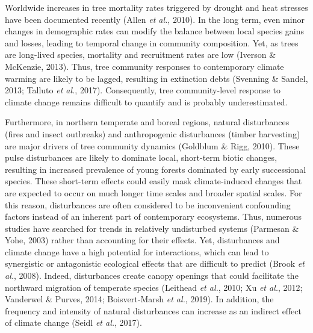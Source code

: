 \documentclass[a4paperpaper,]{article}
\begin{document}
Worldwide increases in tree mortality rates triggered by drought and
heat stresses have been documented recently (Allen \emph{et al.}, 2010).
In the long term, even minor changes in demographic rates can modify the
balance between local species gains and losses, leading to temporal
change in community composition. Yet, as trees are long-lived species,
mortality and recruitment rates are low (Iverson \& McKenzie, 2013).
Thus, tree community responses to contemporary climate warming are
likely to be lagged, resulting in extinction debts (Svenning \& Sandel,
2013; Talluto \emph{et al.}, 2017). Consequently, tree community-level
response to climate change remains difficult to quantify and is probably
underestimated.

Furthermore, in northern temperate and boreal regions, natural
disturbances (fires and insect outbreaks) and anthropogenic disturbances
(timber harvesting) are major drivers of tree community dynamics
(Goldblum \& Rigg, 2010). These pulse disturbances are likely to
dominate local, short-term biotic changes, resulting in increased
prevalence of young forests dominated by early successional species.
These short-term effects could easily mask climate-induced changes that
are expected to occur on much longer time scales and broader spatial
scales. For this reason, disturbances are often considered to be
inconvenient confounding factors instead of an inherent part of
contemporary ecosystems. Thus, numerous studies have searched for trends
in relatively undisturbed systems (Parmesan \& Yohe, 2003) rather than
accounting for their effects. Yet, disturbances and climate change have
a high potential for interactions, which can lead to synergistic or
antagonistic ecological effects that are difficult to predict (Brook
\emph{et al.}, 2008). Indeed, disturbances create canopy openings that
could facilitate the northward migration of temperate species (Leithead
\emph{et al.}, 2010; Xu \emph{et al.}, 2012; Vanderwel \& Purves, 2014;
Boisvert‐Marsh \emph{et al.}, 2019). In addition, the frequency and
intensity of natural disturbances can increase as an indirect effect of
climate change (Seidl \emph{et al.}, 2017).
\end{document}
